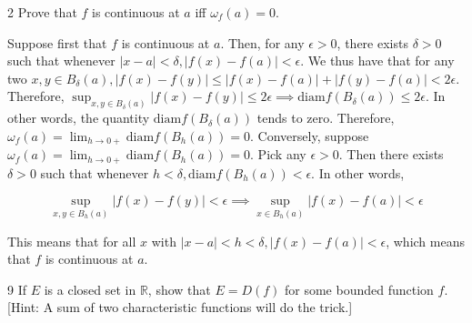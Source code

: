\newpage

\begin{exercise}{2}
    Prove that $f$ is continuous at $a$ iff $\omega_f(a) = 0$.
\end{exercise}

\begin{solution}
    
    Suppose first that $f$ is continuous at $a$.
    Then, for any $\epsilon > 0$, there exists $\delta > 0$ such that whenever $\lvert x - a \rvert < \delta, \lvert f(x) - f(a) \rvert < \epsilon$.
    We thus have that for any two $x, y \in B_{\delta}(a), \lvert f(x) - f(y) \rvert \leq \lvert f(x) - f(a) \rvert + \lvert f(y) - f(a) \rvert < 2\epsilon$.
    Therefore, $\sup_{x, y \in B_{\delta}(a)} \lvert f(x) - f(y) \rvert \leq 2 \epsilon \implies \text{diam} f(B_{\delta}(a)) \leq 2\epsilon$.
    In other words, the quantity $\text{diam} f(B_{\delta}(a))$ tends to zero.
    Therefore, $\omega_f(a) = \lim_{h \rightarrow 0+} \text{diam} f(B_h(a)) = 0$.
    Conversely, suppose $\omega_f(a) = \lim_{h \rightarrow 0+} \text{diam} f(B_h(a)) = 0$.
    Pick any $\epsilon > 0$.
    Then there exists $\delta > 0$ such that whenever $h < \delta, \text{diam} f(B_{h}(a)) < \epsilon$.
    In other words,

    \[\sup_{x, y \in B_h(a)} \lvert f(x) - f(y) \rvert < \epsilon \implies \sup_{x \in B_h(a)} \lvert f(x) - f(a) \rvert < \epsilon\]

    This means that for all $x$ with $\lvert x - a \rvert < h < \delta, \lvert f(x) - f(a) \rvert < \epsilon$, which means that $f$ is continuous at $a$.
\end{solution}

\begin{exercise}{9}
    If $E$ is a closed set in $\mathbb{R}$, show that $E = D(f)$ for some bounded function $f$.
    [Hint: A sum of two characteristic functions will do the trick.]
\end{exercise}

